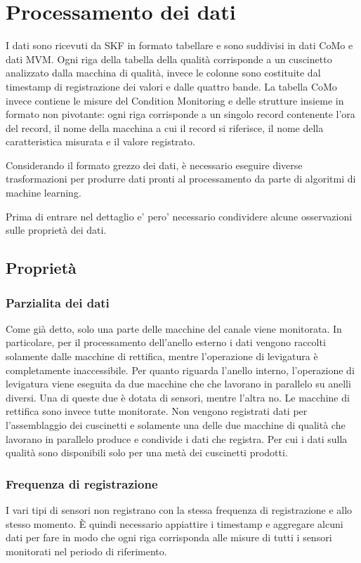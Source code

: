 \section{Processamento dei dati}
I dati sono ricevuti da SKF in formato tabellare e sono suddivisi in dati CoMo e dati MVM. Ogni riga della tabella della qualità corrisponde a un cuscinetto analizzato dalla macchina di qualità, invece le colonne sono costituite dal timestamp di registrazione dei valori e dalle quattro bande.
La tabella CoMo invece contiene le misure del Condition Monitoring e delle strutture insieme in formato non pivotante: ogni riga corrisponde a un singolo record contenente l'ora del record, il nome della macchina a cui il record si riferisce, il nome della caratteristica misurata e il valore registrato.

Considerando il formato grezzo dei dati, è necessario eseguire diverse trasformazioni per produrre dati pronti al processamento da parte di algoritmi di machine learning. 

Prima di entrare nel dettaglio e' pero' necessario condividere alcune osservazioni sulle proprietà dei dati.

\subsection{Proprietà}

\subsubsection{Parzialita dei dati}
Come già detto, solo una parte delle macchine del canale viene monitorata.
In particolare, per il processamento dell'anello esterno i dati vengono raccolti solamente dalle macchine di rettifica, mentre l'operazione di levigatura è completamente inaccessibile.
Per quanto riguarda l'anello interno, l'operazione di levigatura viene eseguita da due macchine che che lavorano in parallelo su anelli diversi. Una di queste due è dotata di sensori, mentre l'altra no. Le macchine di rettifica sono invece tutte monitorate.
Non vengono registrati dati per l'assemblaggio dei cuscinetti e solamente una delle due macchine di qualità che lavorano in parallelo produce e condivide i dati che registra. Per cui i dati sulla qualità sono disponibili solo per una metà dei cuscinetti prodotti.

\subsubsection{Frequenza di registrazione}
I vari tipi di sensori non registrano con la stessa frequenza di registrazione e allo stesso momento.
È quindi necessario appiattire i timestamp e aggregare alcuni dati per fare in modo che ogni riga corrisponda alle misure di tutti i sensori monitorati nel periodo di riferimento.


